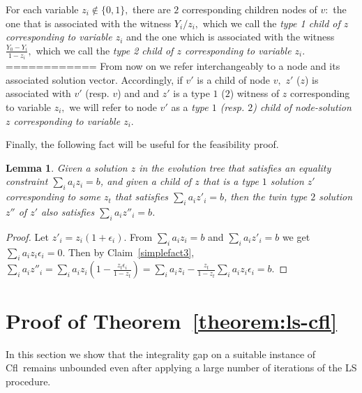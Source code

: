 \documentclass[11pt]{article}\usepackage{amsmath}
\newtheorem{lemma}{Lemma}[section]
\newcommand{\cfl}{{\sc Cfl}}
\begin{document}
For each variable $z_i \not \in \{0,1\},$
there  are  $2$  corresponding 
children  nodes of $v\colon$ the  one  that is associated with   the
witness $Y_{i}/z_{i},$   which we call the \emph{type 1 child of
  $z$ corresponding  to variable $z_i$} and  the one which is
associated with the witness $\frac{Y_0-Y_{i}}{1-z_i},$ 
which we call the \emph{type 2 child of $z$ corresponding to
  variable $z_i.$}
============ \fi 
From now on  we  refer
interchangeably to a node and its  associated solution
vector. Accordingly, if $v'$ is a child of node $v,$ $z'$ ($z$) is 
associated with $v'$ (resp. $v$) and 
and  $z'$ is a type $1$ ($2$) witness  of $z$ corresponding to variable
$z_i,$ 
we will refer to node $v'$ as 
a {\em type $1$ (\mbox{resp.} $2$)  child of node-solution $z$
  corresponding to variable $z_i.$} 



Finally, the following fact will be useful for the feasibility proof. 


\begin{lemma}\label{eqconlemma}
Given a solution $z$ in  the evolution tree that satisfies an equality
constraint $\sum_i a_{i}z_{i}=b$,  and given a child of  $z$ that is a
type  $1$ solution  $z'$ corresponding  to some  $z_t$  that satisfies
$\sum_i a_{i}z'_{i}=b$, then the twin  type $2$ solution $z''$ of $z'$
also satisfies $\sum_i a_{i}z''_{i}=b$.
\end{lemma}
\begin{proof}
Let  $z'_{i}=z_{i}(1+\epsilon_i)$.   From  $\sum_i  a_{i}z_{i}=b$  and
$\sum_i a_{i}z'_{i}=b$ we get $\sum_i a_{i}z_{i}\epsilon_i=0$. Then by
Claim~\ref{simplefact3},          $\sum_i          a_{i}z''_{i}=\sum_i
a_{i}z_{i}(1-\frac{z_t\epsilon_i}{1-z_t})=\sum_ia_{i}z_{i}            -
\frac{z_t}{1-z_t}\sum_i a_{i}z_{i}\epsilon_i=b.$
\end{proof}








\section{Proof of Theorem~\ref{theorem:ls-cfl}}
\label{sec:ls_cfl}

In  this  section we  show  that the  integrality  gap  on a  suitable
instance of \cfl\ remains unbounded even after applying a large number
of iterations of the LS procedure.  \iffalse More precisely, we reduce
the existence of protection matrices conditions to the construction of
the nodes  of an evolution  tree and we  prove that the nodes  of that
tree up to a desired depth (rounds of LS) are well defined.  \fi
\end{document}
